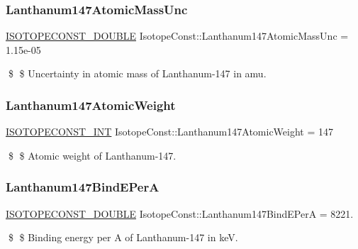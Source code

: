\subsubsection{\texorpdfstring{Lanthanum147\+Atomic\+Mass\+Unc}{Lanthanum147AtomicMassUnc}}
{\footnotesize\ttfamily \mbox{\hyperlink{group___isotope_const-_macros_ga8f45a7272ce02c0b4c65c44636ed719a}{I\+S\+O\+T\+O\+P\+E\+C\+O\+N\+S\+T\+\_\+\+D\+O\+U\+B\+LE}} Isotope\+Const\+::\+Lanthanum147\+Atomic\+Mass\+Unc = 1.\+15e-\/05}

\$ \$ Uncertainty in atomic mass of Lanthanum-\/147 in amu. \mbox{\label{group___isotope_const-_lanthanum-_la147_gaaa3de4481a19a7ac8ebaf15b69c6e30b}} 
\subsubsection{\texorpdfstring{Lanthanum147\+Atomic\+Weight}{Lanthanum147AtomicWeight}}
{\footnotesize\ttfamily \mbox{\hyperlink{group___isotope_const-_macros_ga5f18360b3e99483a35c32d789e62621c}{I\+S\+O\+T\+O\+P\+E\+C\+O\+N\+S\+T\+\_\+\+I\+NT}} Isotope\+Const\+::\+Lanthanum147\+Atomic\+Weight = 147}

\$ \$ Atomic weight of Lanthanum-\/147. \mbox{\label{group___isotope_const-_lanthanum-_la147_ga3b0dacbc79550d11a31ab22c8040d73a}} 
\subsubsection{\texorpdfstring{Lanthanum147\+Bind\+E\+PerA}{Lanthanum147BindEPerA}}
{\footnotesize\ttfamily \mbox{\hyperlink{group___isotope_const-_macros_ga8f45a7272ce02c0b4c65c44636ed719a}{I\+S\+O\+T\+O\+P\+E\+C\+O\+N\+S\+T\+\_\+\+D\+O\+U\+B\+LE}} Isotope\+Const\+::\+Lanthanum147\+Bind\+E\+PerA = 8221.}

\$ \$ Binding energy per A of Lanthanum-\/147 in keV. \mbox{\label{group___isotope_const-_lanthanum-_la147_ga5d34c39385493983a7f408643a86a7f0}} 
